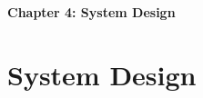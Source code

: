 

\cleardoublepage %
\thispagestyle{plain} %

\vspace*{\fill}
\begin{center}
    {\Huge\bfseries Chapter 4: System Design \par}
    \vspace{1cm}
\end{center}
\vspace*{\fill}

\clearpage %

\chapter{System Design}
\label{chap:system_design}





